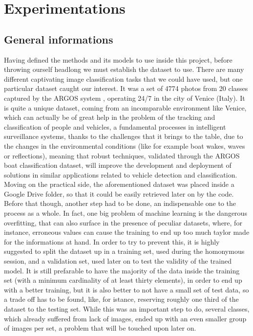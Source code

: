 \documentclass[12pt,a4paper]{report}
\begin{document}
\chapter{Experimentations}

\section{General informations}
Having defined the methods and its models to use inside this project, before throwing ourself headlong we must establish the 
dataset to use. There are many different captivating image classification tasks that we could have used, but one particular dataset caught our interest. It was a set of 4774 photos from 20 classes captured by the ARGOS system \cite{argos_dataset}, operating 24/7 in the city of Venice (Italy). It is quite a unique dataset, coming from an incomparable environment like Venice, which can actually be of great help in the problem of the tracking and classification of people and vehicles, a fundamental processes in intelligent surveillance systems, thanks to the challenges that it brings to the table, due to the changes in the environmental conditions (like for example boat wakes, waves or reflections), meaning that robust techniques, validated through the ARGOS boat classification dataset, will improve the development and deployment of solutions in similar applications related to vehicle detection and classification. \\
Moving on the practical side, the aforementioned dataset was placed inside a Google Drive folder, so that it could be easily retrieved later on by the code. Before that though, another step had to be done, an indispensable one to the process as a whole. In fact, one big problem of machine learning is the dangerous overfitting, that can also surface in the presence of peculiar datasets, where, for instance, erroneous values can cause the training to end up too much taylor made for the informations at hand. In order to try to prevent this, it is highly suggested to split the dataset up in a training set, used during the homonymous session, and a validation set, used later on to test the validity of the trained model. It is still prefarable to have the majority of the data inside the training set (with a minimum cardinality of at least thirty elements), in order to end up with a better training, but it is also better to not have a small set of test data, so a trade off has to be found, like, for istance, reserving roughly one third of the dataset to the testing set. While this was an important step to do, several classes, which already suffered from lack of images, ended up with an even smaller group of images per set, a problem that will be touched upon later on. \\ \\
\end{document}
